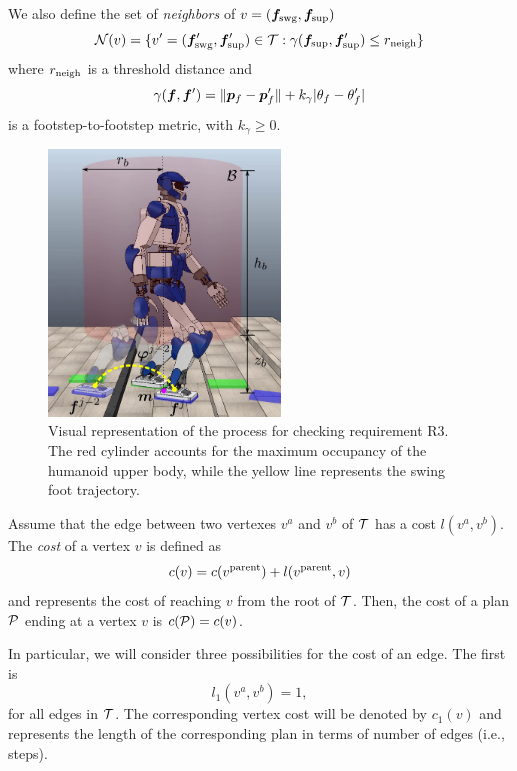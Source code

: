 We also define the set of {\em neighbors} of $v=({\bm{f}}_{\rm swg}, {\bm{f}}_{\rm sup})$
\[
{\cal N}(v) = \{ v'=({\bm{f}}'_{\rm swg}, {\bm{f}}'_{\rm sup}) \in {\cal T} : 
 \gamma({\bm{f}}_{\rm sup}, {\bm{f}}'_{\rm sup}) \le r_{\rm neigh}\}
\]
where $r_{\rm neigh}$ is a threshold distance and
\begin{equation}
\gamma({\bm{f}}, {\bm{f}}') = \lVert {\bm{p}}_f - {\bm{p}}_f' \rVert + k_{\gamma}|\theta_f-\theta_f'|
\label{eq:WoS:footstepToFootstepMetric}
\end{equation}
is a footstep-to-footstep metric, with $k_{\gamma}\ge 0$.

\begin{figure}
\centering
\includegraphics[width=0.55\textwidth]{figures/R3_CollisionCheck.png}
\caption{Visual representation of the process for checking requirement R3. The red cylinder accounts for the maximum occupancy of the humanoid upper body, while the yellow line represents the swing foot trajectory.}
\label{fig:WoS:ReqCollisionCheck}
\end{figure}

Assume that the edge between two vertexes $v^a$ and $v^b$ of $\cal T$ has a cost $l(v^a,v^b)$. 
The {\em cost} of a vertex $v$ is defined as
\[
c(v) = c(v^{\rm parent}) + l(v^{\rm parent}, v)
\]
and represents the cost of reaching $v$ from the root of $\cal T$. 
Then, the cost of a plan $\cal P$ ending at a vertex $v$ is $c({\cal P}) = c(v)$.

In particular, we will consider three possibilities for the cost of an edge. The first is
\begin{equation}
l_1(v^a, v^b) = 1,
\label{eq:WoS:costSteps}
\end{equation}
for all edges in $\cal T$. The corresponding vertex cost will be denoted by $c_1(v)$ and represents the length of the corresponding plan in terms of number of edges (i.e., steps). 
    
